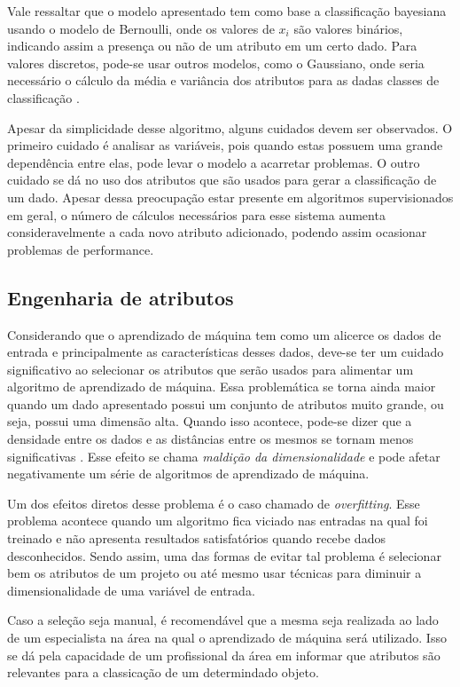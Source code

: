 Vale ressaltar que o modelo apresentado tem como base a classificação
bayesiana usando o modelo de Bernoulli, onde os valores de $x_{i}$ são valores
binários, indicando assim a presença ou não de um atributo em um certo dado.
Para valores discretos, pode-se usar outros modelos, como o Gaussiano, onde
seria necessário o cálculo da média e variância dos atributos para as dadas
classes de classificação \cite{zhang2004optimality}.

Apesar da simplicidade desse algoritmo, alguns cuidados devem ser observados.
O primeiro cuidado é analisar as variáveis, pois quando estas possuem uma grande
dependência entre elas, pode levar o modelo a acarretar problemas. O outro cuidado
se dá no uso dos atributos que são usados para gerar a classificação de um dado.
Apesar dessa preocupação estar presente em algoritmos supervisionados em geral,
o número de cálculos necessários para esse sistema aumenta consideravelmente a
cada novo atributo adicionado, podendo assim ocasionar problemas de performance.

\subsection{Engenharia de atributos}

Considerando que o aprendizado de máquina tem como um alicerce os dados de entrada
e principalmente as características desses dados, deve-se ter um cuidado
significativo ao selecionar os atributos que serão usados para alimentar um
algoritmo de aprendizado de máquina. Essa problemática se torna ainda maior
quando um dado apresentado possui um conjunto de atributos muito grande, ou
seja, possui uma dimensão alta. Quando isso acontece, pode-se dizer que a
densidade entre os dados e as distâncias entre os mesmos se tornam menos
significativas \cite{amatriain2011data}. Esse efeito se chama \textit{maldição
da dimensionalidade} e pode afetar negativamente um série de algoritmos de
aprendizado de máquina.

Um dos efeitos diretos desse problema é o caso chamado de \textit{overfitting}.
Esse problema acontece quando um algoritmo fica viciado nas entradas na qual foi
treinado e não apresenta resultados satisfatórios quando recebe dados desconhecidos.
Sendo assim, uma das formas de evitar tal problema é selecionar bem os atributos
de um projeto ou até mesmo usar técnicas para diminuir a dimensionalidade de uma
variável de entrada.

Caso a seleção seja manual, é recomendável que a mesma seja realizada ao lado de
um especialista na área na qual o aprendizado de máquina será utilizado. Isso se
dá pela capacidade de um profissional da área em informar que atributos são
relevantes para a classicação de um determindado objeto.

